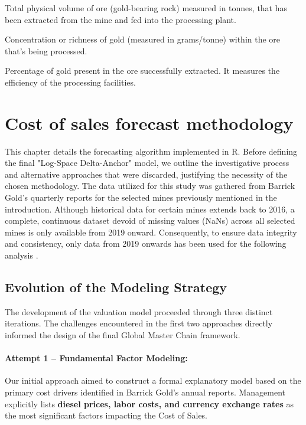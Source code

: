 \begin{definition}
Total physical volume of ore (gold-bearing rock) measured in tonnes, that has been extracted from the mine and fed into the processing plant.
\end{definition}

\begin{definition}
Concentration or richness of gold (measured in grams/tonne) within the ore that's being processed.
\end{definition}

\begin{definition}
Percentage of gold present in the ore successfully extracted. It measures the efficiency of the processing facilities.
\end{definition}

\section{Cost of sales forecast methodology}
This chapter details the forecasting algorithm implemented in R. Before defining the final "Log-Space Delta-Anchor" model, we outline the investigative process and alternative approaches that were discarded, justifying the necessity of the chosen methodology. The data utilized for this study was gathered from Barrick Gold's quarterly reports for the selected mines previously mentioned in the introduction. Although historical data for certain mines extends back to 2016, a complete, continuous dataset devoid of missing values (NaNs) across all selected mines is only available from 2019 onward. Consequently, to ensure data integrity and consistency, only data from 2019 onwards has been used for the following analysis .

\subsection{Evolution of the Modeling Strategy}
The development of the valuation model proceeded through three distinct iterations. The challenges encountered in the first two approaches directly informed the design of the final Global Master Chain framework.

\paragraph{Attempt 1 -- Fundamental Factor Modeling:}
Our initial approach aimed to construct a formal explanatory model based on the primary cost drivers identified in Barrick Gold's annual reports. Management explicitly lists \textbf{diesel prices, labor costs, and currency exchange rates} as the most significant factors impacting the Cost of Sales.


